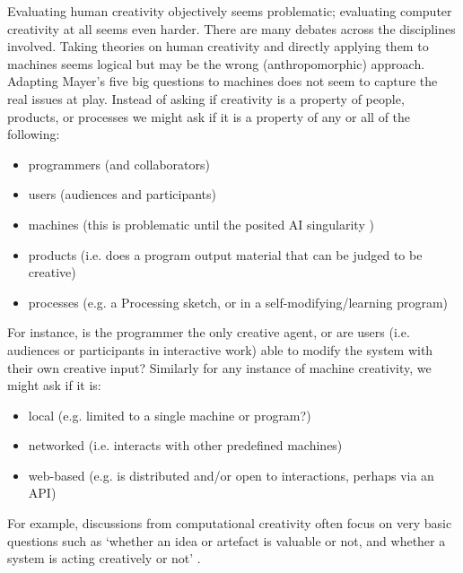 \begin{leftbar}
  Evaluating human creativity objectively seems problematic; evaluating computer creativity at all seems even harder. There are many debates across the disciplines involved. Taking theories on human creativity and directly applying them to machines seems logical but may be the wrong (anthropomorphic) approach. Adapting Mayer's five big questions \cite{Mayer1999} to machines does not seem to capture the real issues at play. Instead of asking if creativity is a property of people, products, or processes we might ask if it is a property of any or all of the following:

  \begin{itemize}
    \item programmers (and collaborators)
    \item users (audiences and participants)
    \item machines (this is problematic until the posited AI singularity \cite{Schmidhuber2006a})
    \item products (i.e. does a program output material that can be judged to be creative)
    \item processes (e.g. a Processing sketch, or in a self-modifying/learning program)
  \end{itemize}

  For instance, is the programmer the only creative agent, or are users (i.e. audiences or participants in interactive work) able to modify the system with their own creative input? Similarly for any instance of machine creativity, we might ask if it is:

  \begin{itemize}
    \item local (e.g. limited to a single machine or program?)
    \item networked (i.e. interacts with other predefined machines)
    \item web-based (e.g. is distributed and/or open to interactions, perhaps via an API)
  \end{itemize}

  For example, discussions from computational creativity often focus on very basic questions such as `whether an idea or artefact is valuable or not, and whether a system is acting creatively or not' \cite{Pease2011}.
\end{leftbar}


